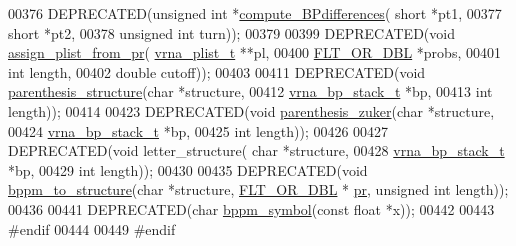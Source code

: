 \begin{DoxyCode}
00376 DEPRECATED(\textcolor{keywordtype}{unsigned} \textcolor{keywordtype}{int}  *\hyperlink{group__struct__utils_gadd463184355d0803b6ee6e09f29182f2}{compute\_BPdifferences}( \textcolor{keywordtype}{short} *pt1,
00377                                       \textcolor{keywordtype}{short} *pt2,
00378                                       \textcolor{keywordtype}{unsigned} \textcolor{keywordtype}{int} turn));
00379 
00399 DEPRECATED(\textcolor{keywordtype}{void}  \hyperlink{group__struct__utils_gacfdacc119b749bccf939de445afea07b}{assign\_plist\_from\_pr}( \hyperlink{group__data__structures_structvrna__plist__s}{vrna\_plist\_t} **pl,
00400                             \hyperlink{group__data__structures_ga31125aeace516926bf7f251f759b6126}{FLT\_OR\_DBL} *probs,
00401                             \textcolor{keywordtype}{int} length,
00402                             \textcolor{keywordtype}{double} cutoff));
00403 
00411 DEPRECATED(\textcolor{keywordtype}{void} \hyperlink{group__struct__utils_gadf0ad2d46c9ca7b850437d1b79627a7e}{parenthesis\_structure}(\textcolor{keywordtype}{char} *structure,
00412                                       \hyperlink{group__data__structures_structvrna__bp__stack__s}{vrna\_bp\_stack\_t} *bp,
00413                                       \textcolor{keywordtype}{int} length));
00414 
00423 DEPRECATED(\textcolor{keywordtype}{void} \hyperlink{group__struct__utils_gab9c5c8311bd5120900585d4fa50c2df0}{parenthesis\_zuker}(\textcolor{keywordtype}{char} *structure,
00424                                   \hyperlink{group__data__structures_structvrna__bp__stack__s}{vrna\_bp\_stack\_t} *bp,
00425                                   \textcolor{keywordtype}{int} length));
00426 
00427 DEPRECATED(\textcolor{keywordtype}{void} letter\_structure( \textcolor{keywordtype}{char} *structure,
00428                                   \hyperlink{group__data__structures_structvrna__bp__stack__s}{vrna\_bp\_stack\_t} *bp,
00429                                   \textcolor{keywordtype}{int} length));
00430 
00435 DEPRECATED(\textcolor{keywordtype}{void}  \hyperlink{group__struct__utils_ga129d81c4a1ead793c5b2311333e03dfa}{bppm\_to\_structure}(\textcolor{keywordtype}{char} *structure, \hyperlink{group__data__structures_ga31125aeace516926bf7f251f759b6126}{FLT\_OR\_DBL} *
      \hyperlink{fold__vars_8h_ac98ec419070aee6831b44e5c700f090f}{pr}, \textcolor{keywordtype}{unsigned} \textcolor{keywordtype}{int} length));
00436 
00441 DEPRECATED(\textcolor{keywordtype}{char}    \hyperlink{group__struct__utils_ga49962ad6242b8c628de6ca16bb831c1d}{bppm\_symbol}(\textcolor{keyword}{const} \textcolor{keywordtype}{float} *x));
00442 
00443 \textcolor{preprocessor}{#endif}
00444 
00449 \textcolor{preprocessor}{#endif}
\end{DoxyCode}
